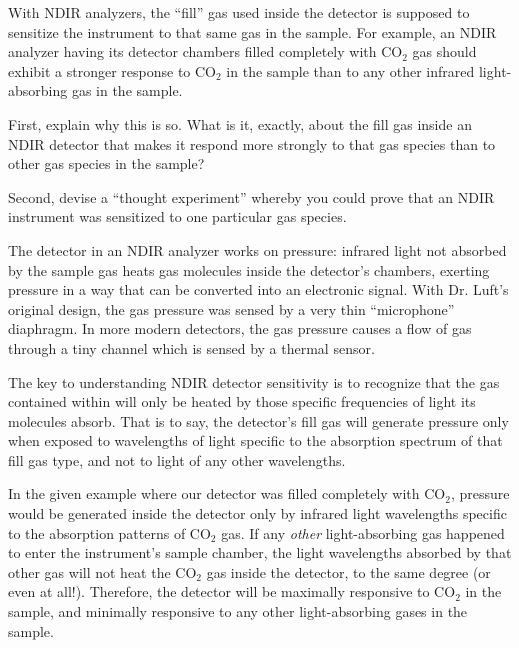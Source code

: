 
With NDIR analyzers, the ``fill'' gas used inside the detector is supposed to sensitize the instrument to that same gas in the sample.  For example, an NDIR analyzer having its detector chambers filled completely with CO$_{2}$ gas should exhibit a stronger response to CO$_{2}$ in the sample than to any other infrared light-absorbing gas in the sample.

\vskip 10pt

First, explain why this is so.  What is it, exactly, about the fill gas inside an NDIR detector that makes it respond more strongly to that gas species than to other gas species in the sample?

\vskip 10pt

Second, devise a ``thought experiment'' whereby you could prove that an NDIR instrument was sensitized to one particular gas species.






The detector in an NDIR analyzer works on pressure: infrared light not absorbed by the sample gas heats gas molecules inside the detector's chambers, exerting pressure in a way that can be converted into an electronic signal.  With Dr. Luft's original design, the gas pressure was sensed by a very thin ``microphone'' diaphragm.  In more modern detectors, the gas pressure causes a flow of gas through a tiny channel which is sensed by a thermal sensor.

The key to understanding NDIR detector sensitivity is to recognize that the gas contained within will only be heated by those specific frequencies of light its molecules absorb.  That is to say, the detector's fill gas will generate pressure only when exposed to wavelengths of light specific to the absorption spectrum of that fill gas type, and not to light of any other wavelengths.

In the given example where our detector was filled completely with CO$_{2}$, pressure would be generated inside the detector only by infrared light wavelengths specific to the absorption patterns of CO$_{2}$ gas.  If any {\it other} light-absorbing gas happened to enter the instrument's sample chamber, the light wavelengths absorbed by that other gas will not heat the CO$_{2}$ gas inside the detector, to the same degree (or even at all!).  Therefore, the detector will be maximally responsive to CO$_{2}$ in the sample, and minimally responsive to any other light-absorbing gases in the sample.

